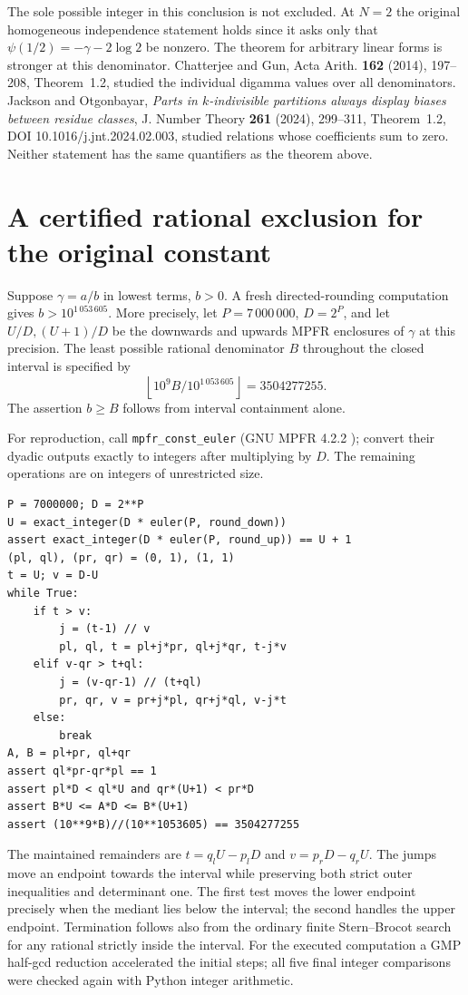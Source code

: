 \documentclass[11pt,a4paper,oneside,openany]{report}
\theoremstyle{remark}\newtheorem{remark}[theorem]{Remark}
\numberwithin{equation}{section}
\begin{document}
The sole possible integer in this conclusion is not excluded. At $N=2$
the original homogeneous independence statement holds since it asks only
that $\psi(1/2)=-\gamma-2\log2$ be nonzero. The theorem for arbitrary
linear forms is stronger at this denominator. Chatterjee and Gun,
Acta Arith. \textbf{162} (2014), 197--208, Theorem~1.2, studied the
individual digamma values over all denominators. Jackson and Otgonbayar,
\emph{Parts in $k$-indivisible partitions always display biases between
residue classes}, J. Number Theory \textbf{261} (2024), 299--311,
Theorem~1.2, DOI 10.1016/j.jnt.2024.02.003, studied relations whose coefficients sum to zero.
Neither statement has the same quantifiers as the theorem above.

\section{A certified rational exclusion for the original constant}
\label{ch7:cf7:section}
Suppose $\gamma=a/b$ in lowest terms, $b>0$. A fresh directed-rounding
computation gives $b>10^{1\,053\,605}$. More precisely, let
$P=7\,000\,000$, $D=2^P$, and let $U/D,(U+1)/D$ be the downwards
and upwards MPFR enclosures of $\gamma$ at this precision. The least
possible rational denominator $B$ throughout the closed interval is
specified by
\[
  \left\lfloor 10^9 B/10^{1\,053\,605}\right\rfloor=3504277255 .
\]
The assertion $b\ge B$ follows from interval containment alone.

For reproduction, call \texttt{mpfr\_const\_euler} (GNU MPFR 4.2.2 \cite{cf}); convert their
dyadic outputs exactly to integers after multiplying by $D$.
The remaining operations are on integers of unrestricted size.
\begin{verbatim}
P = 7000000; D = 2**P
U = exact_integer(D * euler(P, round_down))
assert exact_integer(D * euler(P, round_up)) == U + 1
(pl, ql), (pr, qr) = (0, 1), (1, 1)
t = U; v = D-U
while True:
    if t > v:
        j = (t-1) // v
        pl, ql, t = pl+j*pr, ql+j*qr, t-j*v
    elif v-qr > t+ql:
        j = (v-qr-1) // (t+ql)
        pr, qr, v = pr+j*pl, qr+j*ql, v-j*t
    else:
        break
A, B = pl+pr, ql+qr
assert ql*pr-qr*pl == 1
assert pl*D < ql*U and qr*(U+1) < pr*D
assert B*U <= A*D <= B*(U+1)
assert (10**9*B)//(10**1053605) == 3504277255
\end{verbatim}
The maintained remainders are $t=q_lU-p_lD$ and $v=p_rD-q_rU$.
The jumps move an endpoint towards the interval while preserving both
strict outer inequalities and determinant one. The first test moves
the lower endpoint precisely when the mediant lies below the
interval; the second handles the upper endpoint. Termination follows
also from the ordinary finite Stern--Brocot search for any rational
strictly inside the interval. For the executed computation a GMP
half-gcd reduction accelerated the initial steps; all five final
integer comparisons were checked again with Python integer arithmetic.
\end{document}
